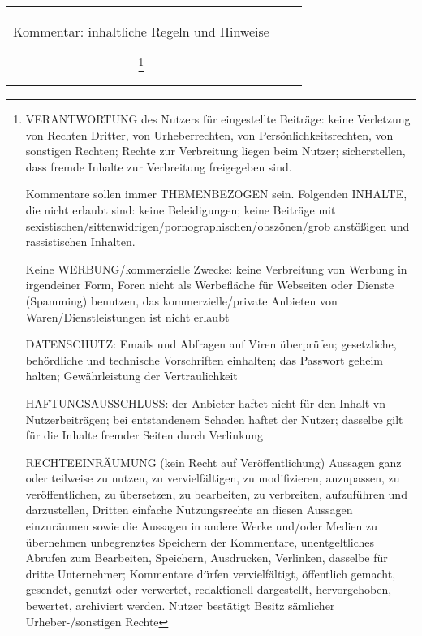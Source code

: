 \begin{landscape}
\begin{tabular}{ccc}
{		
Kommentar: inhaltliche Regeln und Hinweise


\footnote{VERANTWORTUNG des Nutzers für eingestellte Beiträge: keine Verletzung von Rechten Dritter, von Urheberrechten, von Persönlichkeitsrechten, von sonstigen Rechten; Rechte zur Verbreitung liegen beim Nutzer; sicherstellen, dass fremde Inhalte zur Verbreitung freigegeben sind. 

Kommentare sollen immer THEMENBEZOGEN sein. 
Folgenden INHALTE, die nicht erlaubt sind: keine Beleidigungen;  keine Beiträge mit sexistischen/sittenwidrigen/pornographischen/obszönen/grob anstößigen und rassistischen Inhalten. 

Keine WERBUNG/kommerzielle Zwecke: 
keine Verbreitung von Werbung in irgendeiner Form, Foren nicht als Werbefläche für Webseiten oder Dienste (Spamming) benutzen, das kommerzielle/private Anbieten von Waren/Dienstleistungen ist nicht erlaubt

DATENSCHUTZ: 
Emails und Abfragen auf Viren überprüfen; gesetzliche, behördliche und technische Vorschriften einhalten; das Passwort geheim halten; Gewährleistung der Vertraulichkeit

HAFTUNGSAUSSCHLUSS: 
der Anbieter haftet nicht für den Inhalt vn Nutzerbeiträgen; bei entstandenem Schaden haftet der Nutzer; 
dasselbe gilt für die Inhalte fremder Seiten durch Verlinkung

RECHTEEINRÄUMUNG (kein Recht auf Veröffentlichung)
Aussagen ganz oder teilweise zu nutzen, zu vervielfältigen, zu modifizieren, anzupassen, zu veröffentlichen, zu übersetzen, zu bearbeiten, zu verbreiten, aufzuführen und darzustellen, Dritten einfache Nutzungsrechte an diesen Aussagen einzuräumen sowie die Aussagen in andere Werke und/oder Medien zu übernehmen
unbegrenztes Speichern der Kommentare, unentgeltliches Abrufen zum Bearbeiten, Speichern, Ausdrucken, Verlinken, dasselbe für dritte Unternehmer; Kommentare dürfen vervielfältigt, öffentlich gemacht, gesendet, genutzt oder verwertet, redaktionell dargestellt, hervorgehoben, bewertet, archiviert werden.
Nutzer bestätigt Besitz sämlicher Urheber-/sonstigen Rechte

}}
\end{tabular}
\end{landscape}
